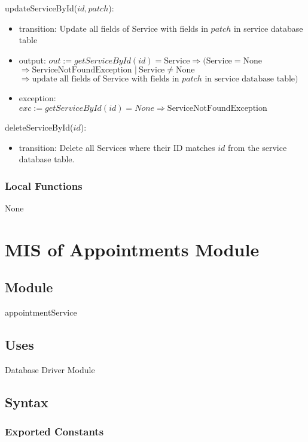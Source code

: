 \documentclass[12pt, titlepage]{article}
\begin{document}
\noindent updateServiceById($id, patch$):
\begin{itemize}
	\item transition: Update all fields of Service with fields in $patch$ in service database table
	\item output: $out := getServiceById(id) = \text{Service} \Rightarrow (\text{Service} = \text{None} $ \\
		      $\Rightarrow \text{ServiceNotFoundException } |\ \text{Service} \neq \text{None}$ \\ $\Rightarrow
		      \text{update all fields of Service with fields in } patch \text{ in service database table})$
	\item exception: $exc := getServiceById(id) = None \Rightarrow \text{ServiceNotFoundException}$
\end{itemize}

\noindent deleteServiceById($id$):
\begin{itemize}
	\item transition: Delete all Services where their ID matches $id$ from the service database table.
\end{itemize}

\subsubsection{Local Functions}

None

\newpage

\section{MIS of Appointments Module} \label{mAppointments}
\subsection{Module}

appointmentService

\subsection{Uses}

Database Driver Module

\subsection{Syntax}

\subsubsection{Exported Constants}
\end{document}
